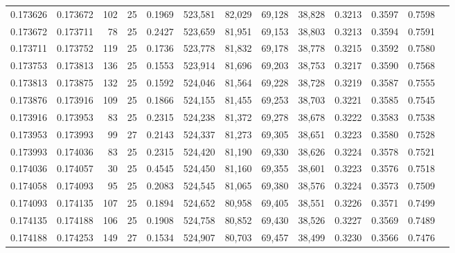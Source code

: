 \begin{tabular}{rrrrrrrrrrrrr}
0.173626 & 0.173672 &   102 &  25 &                                     0.1969 & 523,581 &  82,029 &  69,128 &  38,828 & 0.3213 & 0.3597 & 0.7598 \\
0.173672 & 0.173711 &    78 &  25 &                                     0.2427 & 523,659 &  81,951 &  69,153 &  38,803 & 0.3213 & 0.3594 & 0.7591 \\
0.173711 & 0.173752 &   119 &  25 &                                     0.1736 & 523,778 &  81,832 &  69,178 &  38,778 & 0.3215 & 0.3592 & 0.7580 \\
0.173753 & 0.173813 &   136 &  25 &                                     0.1553 & 523,914 &  81,696 &  69,203 &  38,753 & 0.3217 & 0.3590 & 0.7568 \\
0.173813 & 0.173875 &   132 &  25 &                                     0.1592 & 524,046 &  81,564 &  69,228 &  38,728 & 0.3219 & 0.3587 & 0.7555 \\
0.173876 & 0.173916 &   109 &  25 &                                     0.1866 & 524,155 &  81,455 &  69,253 &  38,703 & 0.3221 & 0.3585 & 0.7545 \\
0.173916 & 0.173953 &    83 &  25 &                                     0.2315 & 524,238 &  81,372 &  69,278 &  38,678 & 0.3222 & 0.3583 & 0.7538 \\
0.173953 & 0.173993 &    99 &  27 &                                     0.2143 & 524,337 &  81,273 &  69,305 &  38,651 & 0.3223 & 0.3580 & 0.7528 \\
0.173993 & 0.174036 &    83 &  25 &                                     0.2315 & 524,420 &  81,190 &  69,330 &  38,626 & 0.3224 & 0.3578 & 0.7521 \\
0.174036 & 0.174057 &    30 &  25 &                                     0.4545 & 524,450 &  81,160 &  69,355 &  38,601 & 0.3223 & 0.3576 & 0.7518 \\
0.174058 & 0.174093 &    95 &  25 &                                     0.2083 & 524,545 &  81,065 &  69,380 &  38,576 & 0.3224 & 0.3573 & 0.7509 \\
0.174093 & 0.174135 &   107 &  25 &                                     0.1894 & 524,652 &  80,958 &  69,405 &  38,551 & 0.3226 & 0.3571 & 0.7499 \\
0.174135 & 0.174188 &   106 &  25 &                                     0.1908 & 524,758 &  80,852 &  69,430 &  38,526 & 0.3227 & 0.3569 & 0.7489 \\
0.174188 & 0.174253 &   149 &  27 &                                     0.1534 & 524,907 &  80,703 &  69,457 &  38,499 & 0.3230 & 0.3566 & 0.7476 \\

\end{tabular}
